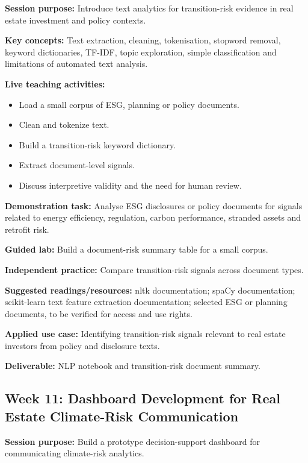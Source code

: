 \documentclass[
  a4paper,
]{article}
\providecommand{\tightlist}{%
  \setlength{\itemsep}{0pt}\setlength{\parskip}{0pt}}
\begin{document}
\textbf{Session purpose:} Introduce text analytics for transition-risk
evidence in real estate investment and policy contexts.

\textbf{Key concepts:} Text extraction, cleaning, tokenisation, stopword
removal, keyword dictionaries, TF-IDF, topic exploration, simple
classification and limitations of automated text analysis.

\textbf{Live teaching activities:}

\begin{itemize}
\tightlist
\item
  Load a small corpus of ESG, planning or policy documents.
\item
  Clean and tokenize text.
\item
  Build a transition-risk keyword dictionary.
\item
  Extract document-level signals.
\item
  Discuss interpretive validity and the need for human review.
\end{itemize}

\textbf{Demonstration task:} Analyse ESG disclosures or policy documents
for signals related to energy efficiency, regulation, carbon
performance, stranded assets and retrofit risk.

\textbf{Guided lab:} Build a document-risk summary table for a small
corpus.

\textbf{Independent practice:} Compare transition-risk signals across
document types.

\textbf{Suggested readings/resources:} nltk documentation; spaCy
documentation; scikit-learn text feature extraction documentation;
selected ESG or planning documents, to be verified for access and use
rights.

\textbf{Applied use case:} Identifying transition-risk signals relevant
to real estate investors from policy and disclosure texts.

\textbf{Deliverable:} NLP notebook and transition-risk document summary.

\subsection{Week 11: Dashboard Development for Real Estate Climate-Risk
Communication}\label{week-11-dashboard-development-for-real-estate-climate-risk-communication}

\textbf{Session purpose:} Build a prototype decision-support dashboard
for communicating climate-risk analytics.
\end{document}
